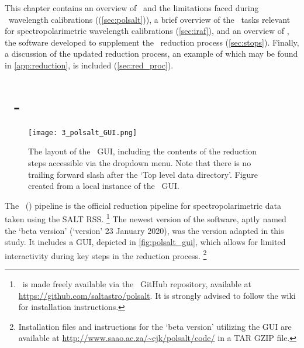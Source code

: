 
This chapter contains an overview of \polsalt\ and the limitations faced during \polsalt\ wavelength calibrations ((\autoref{sec:polsalt})), a brief overview of the \iraf\ tasks relevant for spectropolarimetric wavelength calibrations (\autoref{sec:iraf}), and an overview of \stops, the software developed to supplement the \polsalt\ reduction process (\autoref{sec:stops}). Finally, a discussion of the updated reduction process, an example of which may be found in \autoref{app:reduction}, is included (\autoref{sec:red_proc}).

\section[\textsc{polsalt}]{\polsalt\ - } \label{sec:polsalt}

\begin{figure}[t]
    \centering
    \texttt{[image: 3\_polsalt\_GUI.png]}
    \caption{The layout of the \polsalt\ \gls{GUI}, including the contents of the reduction steps accessible via the dropdown menu. Note that there is no trailing forward slash after the `Top level data directory'. Figure created from a local instance of the \polsalt\ \gls{GUI}.}
    \label{fig:polsalt_gui}
\end{figure}

The \polsalt\ () pipeline is the official reduction pipeline for spectropolarimetric data taken using the \gls{SALT} \gls{RSS}.%
\footnote{\polsalt\ is made freely available via the \polsalt\ GitHub repository, available at \url{https://github.com/saltastro/polsalt}. It is strongly advised to follow the wiki for installation instructions.}
The newest version of the software, aptly named the `beta version' (`version' 23 January 2020), was the version adapted in this study. It includes a \gls{GUI}, depicted in \autoref{fig:polsalt_gui}, which allows for limited interactivity during key steps in the reduction process.%
\footnote{Installation files and instructions for the `beta version' utilizing the \gls{GUI} are available at \url{http://www.saao.ac.za/~ejk/polsalt/code/} in a TAR GZIP file.}

